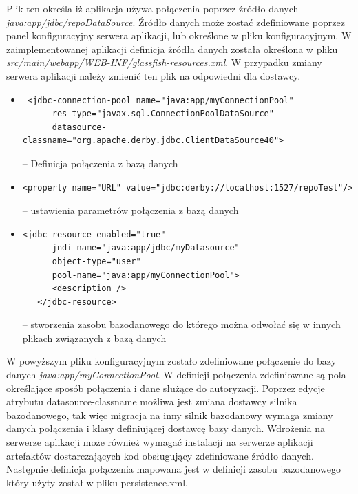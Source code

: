 Plik ten określa iż aplikacja używa połączenia poprzez źródło danych \textit{java:app/jdbc/repoDataSource}. Źródło danych może zostać zdefiniowane poprzez panel konfiguracyjny serwera aplikacji, lub określone w pliku konfiguracyjnym. W zaimplementowanej aplikacji definicja źródła danych została określona w pliku \textit{src/main/webapp/WEB-INF/glassfish-resources.xml}. W przypadku zmiany serwera aplikacji należy zmienić ten plik na odpowiedni dla dostawcy.

\begin{itemize}
	\item  {\footnotesize \begin{verbatim} <jdbc-connection-pool name="java:app/myConnectionPool"
      res-type="javax.sql.ConnectionPoolDataSource"
      datasource-classname="org.apache.derby.jdbc.ClientDataSource40"> \end{verbatim}} -- Definicja połączenia z bazą danych
 	\item  {\footnotesize \begin{verbatim}<property name="URL" value="jdbc:derby://localhost:1527/repoTest"/>\end{verbatim}} -- ustawienia parametrów połączenia z bazą danych
 	
 	
 		\item  {\footnotesize \begin{verbatim}<jdbc-resource enabled="true"
      jndi-name="java:app/jdbc/myDatasource"
      object-type="user"
      pool-name="java:app/myConnectionPool">
      <description />
   </jdbc-resource>\end{verbatim}} -- stworzenia zasobu bazodanowego do którego można odwołać się w innych plikach związanych z bazą danych
\end{itemize}

W powyższym pliku konfiguracyjnym zostało zdefiniowane połączenie do bazy danych \textit{java:app/myConnectionPool}. W definicji połączenia zdefiniowane są pola określające sposób połączenia i dane służące do autoryzacji. Poprzez edycje atrybutu datasource-classname możliwa jest zmiana dostawcy silnika bazodanowego, tak więc migracja na inny silnik bazodanowy wymaga zmiany danych połączenia i klasy definiującej dostawcę bazy danych. Wdrożenia na serwerze aplikacji może również wymagać instalacji na serwerze aplikacji artefaktów dostarczających kod obsługujący zdefiniowane źródło danych. Następnie definicja połączenia mapowana jest w definicji zasobu bazodanowego który użyty został w pliku persistence.xml.

